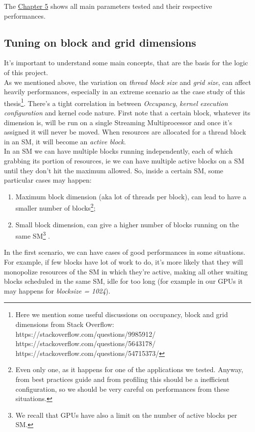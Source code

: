 	The \hyperref[chap:experim]{Chapter 5} shows all main parameters tested and their respective performances.
 
			 
\subsection{Tuning on block and grid dimensions}
	It's important to understand some main concepts, that are the basis for the logic of this project.\\
	As we mentioned above, the variation on \textit{thread block size} and \textit{grid size}, can affect heavily performances, especially in an extreme scenario as the case study of this thesis\footnote{Here we mention some useful discussions on occupancy, block and grid dimensions from Stack Overflow:\\
		https://stackoverflow.com/questions/9985912/\\
		https://stackoverflow.com/questions/5643178/\\
		https://stackoverflow.com/questions/54715373/ }.
	There's a tight correlation in between \textit{Occupancy}, \textit{kernel execution configuration} and kernel code nature.
	First note that a certain block, whatever its dimension is, will be run on a single Streaming Multiprocessor and once it's assigned it will never be moved. When resources are allocated for a thread block in an SM, it will become an \textit{active block}.\\
	In an SM we can have multiple blocks running independently, each of which grabbing its portion of resources, ie we can have multiple active blocks on a SM until they don't hit the maximum allowed\cite{perfoptimize,cudaguide}.
	So, inside a certain SM, some particular cases may happen:
	\begin{enumerate}
		\item Maximum block dimension (aka lot of threads per block), can lead to have a smaller number of blocks\footnote{Even only one, as it happens for one of the applications we tested. Anyway, from best practices guide and from profiling this should be a inefficient configuration, so we should be very careful on performances from these situations.};
		\item Small block dimension, can give a higher number of blocks running on the same SM\footnote{We recall that GPUs have also a limit on the number of active blocks per SM.} .
	\end{enumerate}
	
	In the first scenario, we can have cases of good performances in some situations. For example, if few blocks have lot of work to do, it's more likely that they will monopolize resources of the SM in which they're active, making all other waiting blocks scheduled in the same SM, idle for too long (for example in our GPUs it may happens for \textit{blocksize = 1024}). 
	

